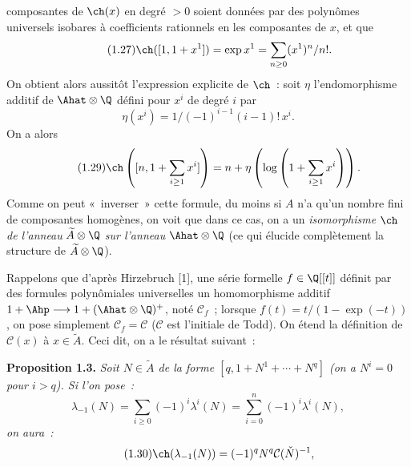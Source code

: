 composantes de $\ch(x)$ en degré $>0$ soient données par des polynômes universels isobares à coefficients rationnels en les composantes de $x$, et que
\begin{equation}\tag{1.27}
\ch([1,1+x^1])=\exp x^1=\sum_{n\geq0}(x^1)^n/n!.
\end{equation}
On obtient alors aussitôt l'expression explicite de $\ch$~: soit $\eta$ l'endomorphisme additif de $\Ahat\otimes\Q$ défini pour $x^i$ de degré $i$ par
\begin{equation}\tag{1.28}
\eta(x^i)=1/(-1)^{i-1}(i-1)!\,x^i.
\end{equation}
On a alors
\begin{equation}\tag{1.29}
\ch\left([n,1+\sum_{i\geq1}x^i]\right)=n+\eta\left(\log\left(1+\sum_{i\geq1}x^i\right)\right).
\end{equation}
Comme on peut «~inverser~» cette formule, du moins si $A$ n'a qu'un nombre fini de composantes homogènes, on voit que dans ce cas, on a un \emph{isomorphisme} $\ch$ \emph{de l'anneau} $\widetilde A\otimes\Q$ \emph{sur l'anneau} $\Ahat\otimes\Q$ (ce qui élucide complètement la structure de $\widetilde A\otimes\Q$).

Rappelons que d'après Hirzebruch [1], une série formelle $f\in\Q[[t]]$ définit par des formules polynômiales universelles un homomorphisme additif $1+\Ahp\longrightarrow 1+(\Ahat\otimes\Q)^+$, noté $\mathcal C_f$~; lorsque $f(t)=t/(1-\exp(-t))$, on pose simplement $\mathcal C_f=\mathcal C$ ($\mathcal C$ est l'initiale de Todd). On étend la définition de $\mathcal C(x)$ à $x\in\widetilde A$. Ceci dit, on a le résultat suivant~:

\textbf{Proposition 1.3.} \emph{Soit $N\in\widetilde A$ de la forme $[q,1+N^1+\cdots+N^q]$ (on a $N^i=0$ pour $i>q$). Si l'on pose~:}
\[
\lambda_{-1}(N)=\sum_{i\geq0}(-1)^i\lambda^i(N)=\sum_{i=0}^{n}(-1)^i\lambda^i(N),
\]
\emph{on aura~:}
\begin{equation}\tag{1.30}
\ch(\lambda_{-1}(N))=(-1)^q N^q\mathcal C(\check N)^{-1},
\end{equation}
